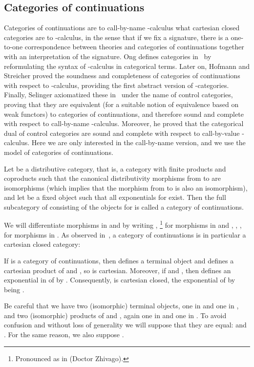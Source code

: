 \documentclass{CSML}
\begin{document}
\subsection{Categories of continuations}
\label{catcont}
Categories of continuations are to call-by-name -calculus what cartesian closed categories are to -calculus, in the sense that if we fix a signature, there is a one-to-one correspondence between  theories and categories of continuations together with an interpretation of the signature. Ong defines  categories in~\cite{OngClassicalProofs} by reformulating the syntax of -calculus in categorical terms. Later on, Hofmann and Streicher proved the soundness and completeness of categories of continuations with respect to -calculus, providing the first abstract version of -categories. Finally, Selinger axiomatized these in~\cite{SelingerControl} under the name of control categories, proving that they are equivalent (for a suitable notion of equivalence based on weak functors) to categories of continuations, and therefore sound and complete with respect to call-by-name -calculus. Moreover, he proved that the categorical dual of control categories are sound and complete with respect to call-by-value -calculus. Here we are only interested in the call-by-name version, and we use the model of categories of continuations.
\begin{defi}
Let  be a distributive category, that is, a category with finite products and coproducts such that the canonical distributivity morphisms from  to  are isomorphisms (which implies that the morphism from  to  is also an isomorphism), and let  be a fixed object such that all exponentials  for  exist. Then the full subcategory  of  consisting of the objects  for  is called a category of continuations.
\end{defi}
We will differentiate morphisms in  and  by writing , \footnote{Pronounced as in   (Doctor Zhivago).}  for morphisms in  and , , ,  for morphisms in . As observed in~\cite{LafontReusStreicher}, a category of continuations  is in particular a cartesian closed category:
\begin{lem}
If  is a category of continuations, then  defines a terminal object and  defines a cartesian product of  and , so  is cartesian. Moreover, if  and , then  defines an exponential in  of  by . Consequently,  is cartesian closed, the exponential of  by  being .
\end{lem}
Be careful that we have two (isomorphic) terminal objects, one in  and one in , and two (isomorphic) products of  and , again one in  and one in . To avoid confusion and without loss of generality we will suppose that they are equal:  and . For the same reason, we also suppose .
\end{document}
